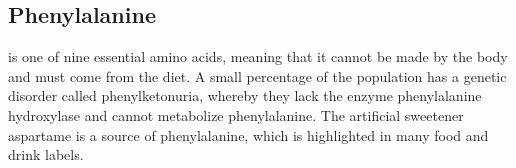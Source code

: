 \documentclass[10pt,a4paper]{book}
\begin{document}
\subsection{	Phenylalanine }
	is one of nine essential amino
	acids, meaning that it cannot
	be made by the body and must
	come from the diet. A small
	percentage of the population
	has a genetic disorder called
	phenylketonuria, whereby they
	lack the enzyme phenylalanine
	hydroxylase and cannot
	metabolize phenylalanine. The
	artificial sweetener aspartame
	is a source of phenylalanine,
	which is highlighted in many
	food and drink labels.
\end{document}
